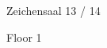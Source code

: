 \documentclass[a4paper]{article}
\begin{document}
\printGenericVSLHeader
\begin{center}
\begin{vsltext}{3cm}{4cm}


    \vspace{0.5cm}

   Zeichensaal 13 / 14

    \vspace{0.5cm}

   Floor 1

\end{vsltext}

\end{center}
\end{document}
